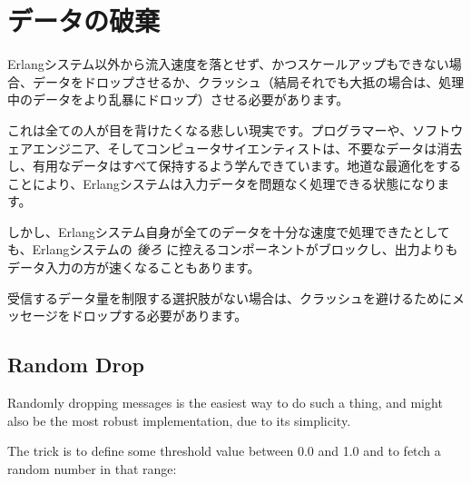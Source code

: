 \section{データの破棄}

Erlangシステム以外から流入速度を落とせず、かつスケールアップもできない場合、データをドロップさせるか、クラッシュ（結局それでも大抵の場合は、処理中のデータをより乱暴にドロップ）させる必要があります。

これは全ての人が目を背けたくなる悲しい現実です。プログラマーや、ソフトウェアエンジニア、そしてコンピュータサイエンティストは、不要なデータは消去し、有用なデータはすべて保持するよう学んできています。地道な最適化をすることにより、Erlangシステムは入力データを問題なく処理できる状態になります。

しかし、Erlangシステム自身が全てのデータを十分な速度で処理できたとしても、Erlangシステムの \emph{後ろ} に控えるコンポーネントがブロックし、出力よりもデータ入力の方が速くなることもあります。

受信するデータ量を制限する選択肢がない場合は、クラッシュを避けるためにメッセージをドロップする必要があります。

\subsection{Random Drop}

Randomly dropping messages is the easiest way to do such a thing, and might also be the most robust implementation, due to its simplicity.

The trick is to define some threshold value between 0.0 and 1.0 and to fetch a random number in that range:

